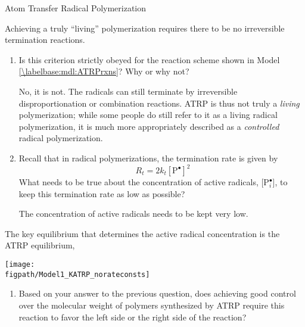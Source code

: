 \begin{activity}{Atom Transfer Radical Polymerization}
\begin{model}
\end{model}


\begin{ctqs}

	\question Achieving a truly ``living'' polymerization requires there to be no irreversible termination reactions.
	
		\begin{enumerate}
		
			\item Is this criterion strictly obeyed for the reaction scheme shown in Model \ref{\labelbase:mdl:ATRPrxns}?  Why or why not?  \label{\labelbase:ctq:terminationsuprression}
			
				\begin{solution}[1in]
				
					No, it is not.  The radicals can still terminate by irreversible disproportionation or combination reactions.
					ATRP is thus not truly a \emph{living} polymerization; while some people do still refer to it as a living radical polymerization, it is much more appropriately described as a \emph{controlled} radical polymerization.
				
				\end{solution}
			
			\item Recall that in radical polymerizations, the termination rate is given by
				\begin{equation*}\
					R_t = 2k_t[\text{P}^\bullet]^2
				\end{equation*}
				What needs to be true about the concentration of active radicals, [P$_i^\bullet$], to keep this termination rate as low as possible?
				
				\begin{solution}[0.9in]
				
					The concentration of active radicals needs to be kept very low.
				
				\end{solution}
			
		\end{enumerate}
	
	\question The key equilibrium that determines the active radical concentration is the ATRP equilibrium,
	
	\centerline{\texttt{[image: \\figpath/Model1\_KATRP\_norateconsts]}}
		
		\begin{enumerate}
			\item Based on your answer to the previous question, does achieving good control over the molecular weight of polymers synthesized by ATRP require this reaction to favor the left side or the right side of the reaction?
			

\end{enumerate}
\end{ctqs}
\end{activity}
